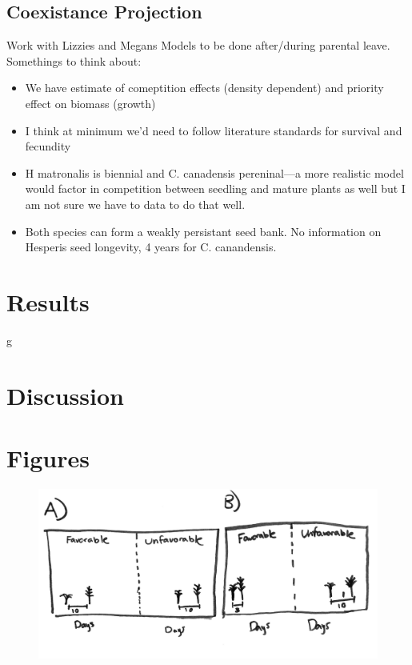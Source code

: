 \documentclass[11pt]{article}\usepackage[]{graphicx}\usepackage[]{color}
\begin{document}
\subsection*{Coexistance Projection}
Work with Lizzies and Megans Models to be done after/during parental leave.\\
Somethings to think about:\\
\begin{itemize}
\item We have estimate of comeptition effects (density dependent) and priority effect on biomass (growth)
\item I think at minimum we'd need to follow literature standards for survival and fecundity
\item H matronalis is biennial and C. canadensis pereninal---a more realistic model would factor in competition between seedling and mature plants as well but I am not sure we have to data to do that well.
\item Both species can form a weakly persistant seed bank. No information on Hesperis seed longevity, 4 years for C. canandensis.
\end{itemize}

\section*{Results}
g

\section*{Discussion}
\section*{Figures}
\begin{figure}[h!]
    \centering
         \includegraphics[width=\textwidth]{..//full_exp/concept_sketch.jpeg}
    \caption{ } 
    \label{fig:concept}
\end{figure}
\end{document}
